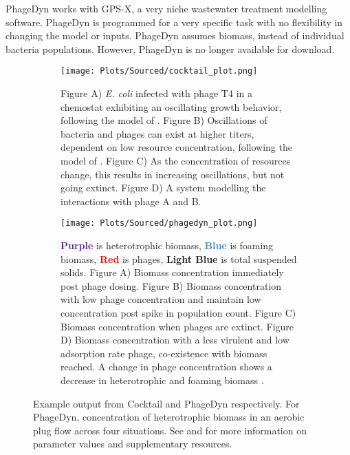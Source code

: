 PhageDyn works with GPS-X, a very niche wastewater treatment modelling software. 
PhageDyn is programmed for a very specific task with no flexibility in changing the model or inputs. 
PhageDyn assumes biomass, instead of individual bacteria populations. 
However, PhageDyn is no longer available for download.

\begin{figure}
    \centering
    \begin{subfigure}{0.49\linewidth}
        \centering
        \captionsetup{width=1\linewidth}
        \texttt{[image: Plots/Sourced/cocktail\_plot.png]}
        \caption{
            Figure A) \textit{E. coli} infected with phage T4 in a chemostat exhibiting an oscillating growth behavior, following the model of \citet{bohannanEffectResourceEnrichment1997}. 
            Figure B) Oscillations of bacteria and phages can exist at higher titers, dependent on low resource concentration, following the model of \citet{lenskiDynamicsInteractionsBacteria1988}. 
            Figure C) As the concentration of resources change, this results in increasing oscillations, but not going extinct. 
            Figure D) A system modelling the interactions with phage A and B. 
        }
        \label{fig:sourced:cocktail_plot}
    \end{subfigure}
    \hfill
    \begin{subfigure}{0.49\linewidth}
        \centering
        \captionsetup{width=1\linewidth}
        \texttt{[image: Plots/Sourced/phagedyn\_plot.png]}
        \caption{
            \textcolor[HTML]{551A8C}{\textbf{Purple}} is heterotrophic biomass, 
            \textcolor[HTML]{4580B4}{\textbf{Blue}} is foaming biomass, 
            \textcolor[HTML]{FF0000}{\textbf{Red}} is phages, 
            \textcolor[HTML]{01E6EE}{\textbf{Light Blue}} is total suspended solids. 
            Figure A) Biomass concentration immediately post phage dosing. 
            Figure B) Biomass concentration with low phage concentration and maintain low concentration post spike in population count. 
            Figure C) Biomass concentration when phages are extinct. 
            Figure D) Biomass concentration with a less virulent and low adsorption rate phage, co-existence with biomass reached. 
            A change in phage concentration shows a decrease in heterotrophic and foaming biomass \cite{krysiak-baltynSimulationPhageDynamics2017}. 
        }
        \label{fig:sourced:phagedyn_plot}
    \end{subfigure}
    \caption{Example output from Cocktail and PhageDyn respectively. For PhageDyn, concentration of heterotrophic biomass in an aerobic plug flow across four situations.
        See \citet{nilssonCocktailComputerProgram2022} and \citet{krysiak-baltynSimulationPhageDynamics2017} for more information on parameter values and supplementary resources. 
    }
    \label{fig:sourced:cocktail_and_phagedyn}
\end{figure}

